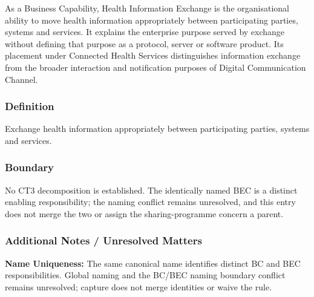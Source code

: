 As a Business Capability, Health Information Exchange is the organisational ability to move health information appropriately between participating parties, systems and services. It explains the enterprise purpose served by exchange without defining that purpose as a protocol, server or software product. Its placement under Connected Health Services distinguishes information exchange from the broader interaction and notification purposes of Digital Communication Channel.

\subsubsection*{Definition}

Exchange health information appropriately between participating parties, systems and services.

\subsubsection*{Boundary}

No CT3 decomposition is established. The identically named BEC is a distinct enabling responsibility; the naming conflict remains unresolved, and this entry does not merge the two or assign the sharing-programme concern a parent.

\subsubsection*{Additional Notes / Unresolved Matters}
\textbf{Name Uniqueness:} The same canonical name identifies distinct BC and BEC responsibilities. Global naming and the BC/BEC naming boundary conflict remains unresolved; capture does not merge identities or waive the rule.

